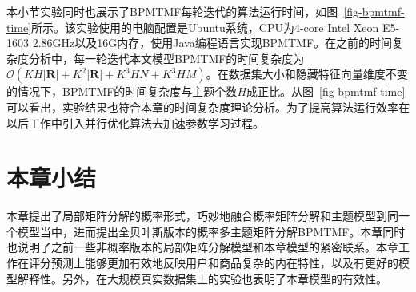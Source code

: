 本小节实验同时也展示了BPMTMF每轮迭代的算法运行时间，如图~\ref{fig-bpmtmf-time}所示。该实验使用的电脑配置是Ubuntu系统，CPU为4-core Intel Xeon E5-1603 2.86GHz以及16G内存，使用Java编程语言实现BPMTMF。在之前的时间复杂度分析中，每一轮迭代本文模型BPMTMF的时间复杂度为$\mathcal{O}(KH|\mathbf{R}|+K^2|\mathbf{R}|+K^3HN+K^3HM)$。在数据集大小和隐藏特征向量维度不变的情况下，BPMTMF的时间复杂度与主题个数$H$成正比。从图~\ref{fig-bpmtmf-time}可以看出，实验结果也符合本章的时间复杂度理论分析。为了提高算法运行效率在以后工作中引入并行优化算法去加速参数学习过程。

\section{本章小结}
\label{sec-bpmtmf-conclusion}
本章提出了局部矩阵分解的概率形式，巧妙地融合概率矩阵分解和主题模型到同一个模型当中，进而提出全贝叶斯版本的概率多主题矩阵分解BPMTMF。本章同时也说明了之前一些非概率版本的局部矩阵分解模型和本章模型的紧密联系。本章工作在评分预测上能够更加有效地反映用户和商品复杂的内在特性，以及有更好的模型解释性。另外，在大规模真实数据集上的实验也表明了本章模型的有效性。

\clearpage
\phantom{s}
\clearpage